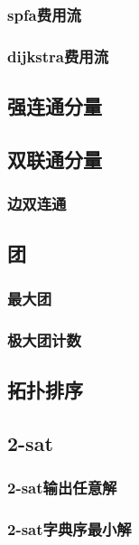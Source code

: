 ﻿\documentclass[a4paper,twocolumn]{article}
\begin{document}
\subsubsection{spfa费用流}

\subsubsection{dijkstra费用流}

\subsection{强连通分量}

\subsection{双联通分量}
\subsubsection{边双连通}

\subsection{团}
\subsubsection{最大团}

\subsubsection{极大团计数}

\subsection{拓扑排序}

\subsection{2-sat}
\subsubsection{2-sat输出任意解}

\subsubsection{2-sat字典序最小解}

\end{document}
